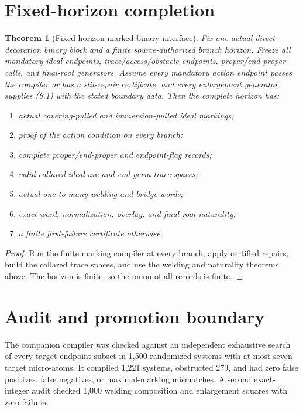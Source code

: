 \documentclass[11pt]{article}
\newtheorem{theorem}{Theorem}[section]
\theoremstyle{definition}
\theoremstyle{remark}
\begin{document}
\section{Fixed-horizon completion}
\begin{theorem}[Fixed-horizon marked binary interface]
Fix one actual direct-decoration binary block and a finite source-authorized
branch horizon.  Freeze all mandatory ideal endpoints, trace/access/obstacle
endpoints, proper/end-proper calls, and final-root generators.  Assume every
mandatory action endpoint passes the compiler or has a slit-repair certificate,
and every enlargement generator supplies (6.1) with the stated boundary data.
Then the complete horizon has:
\begin{enumerate}
\item actual covering-pulled and immersion-pulled ideal markings;
\item proof of the action condition on every branch;
\item complete proper/end-proper and endpoint-flag records;
\item valid collared ideal-arc and end-germ trace spaces;
\item actual one-to-many welding and bridge words;
\item exact word, normalization, overlay, and final-root naturality;
\item a finite first-failure certificate otherwise.
\end{enumerate}
\end{theorem}

\begin{proof}
Run the finite marking compiler at every branch, apply certified repairs, build
the collared trace spaces, and use the welding and naturality theorems above.
The horizon is finite, so the union of all records is finite.
\end{proof}

\section{Audit and promotion boundary}
The companion compiler was checked against an independent exhaustive search of
every target endpoint subset in 1,500 randomized systems with at most seven
target micro-atoms.  It compiled 1,221 systems, obstructed 279, and had zero
false positives, false negatives, or maximal-marking mismatches.  A second
exact-integer audit checked 1,000 welding composition and enlargement squares
with zero failures.
\end{document}
